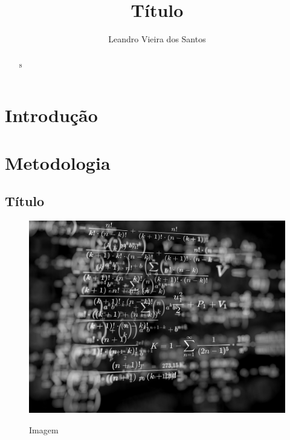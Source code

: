 \documentclass[twocolumn]{article}
\title{Título}
\author{Leandro Vieira dos Santos}
\affil{EREM Regina Pacis\\Palmerina-PE}
\begin{document}
\maketitle        

\begin{abstract}
\lipsum[1]
s\end{abstract}


\section{Introdução}

\lipsum[1]

\section{Metodologia}

\lipsum[3]

\subsection{Título}\label{sec_titulo}

\lipsum[2]

\begin{figure}[!htb]
	\centering\includegraphics[width=\columnwidth]{Figuras/imagem}\\
	\caption{Imagem}\label{im}
\end{figure}

\lipsum[4]
\end{document}
